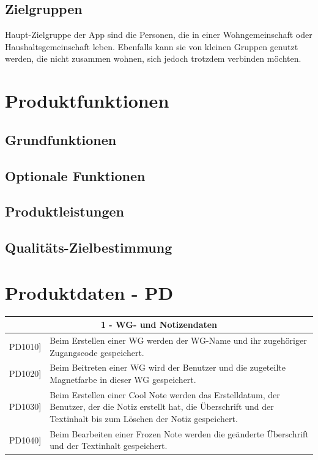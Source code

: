 \documentclass[a4paper]{scrreprt}
\begin{document}
        \section{Zielgruppen}
        Haupt-Zielgruppe der App sind die Personen, die in einer Wohngemeinschaft oder Haushaltsgemeinschaft leben. Ebenfalls kann sie von kleinen Gruppen genutzt werden, die nicht zusammen wohnen, sich jedoch trotzdem verbinden möchten.
        

    \chapter{Produktfunktionen}
    		\section{Grundfunktionen}
    		
    		\section{Optionale Funktionen}
    		
    		\section{Produktleistungen}
    		
    		\section{Qualitäts-Zielbestimmung}

    \chapter{Produktdaten - PD}
    	\begin{table}[h!]
    		\centering
    		\label{my-label}
    		\begin{tabular}{p{2cm}p{12cm}}
    			
    			\multicolumn{2}{c}{\textbf{1 - WG- und Notizendaten}} \\ \hline
    			\centering{[}PD1010{]} & Beim Erstellen einer WG werden der WG-Name und ihr zugehöriger Zugangscode gespeichert.\\
    			\centering{[}PD1020{]}& Beim Beitreten einer WG wird der Benutzer und die zugeteilte Magnetfarbe in dieser WG gespeichert.\\
    			\centering{[}PD1030{]}& Beim Erstellen einer Cool Note werden das Erstelldatum, der Benutzer, der die Notiz erstellt hat, die Überschrift und der Textinhalt bis zum Löschen der Notiz gespeichert.\\ 
    			\centering{[}PD1040{]}& Beim Bearbeiten einer Frozen Note werden die geänderte Überschrift und der Textinhalt gespeichert.\\
    			\hline
    		\end{tabular}
    	\end{table}
        
\end{document}
